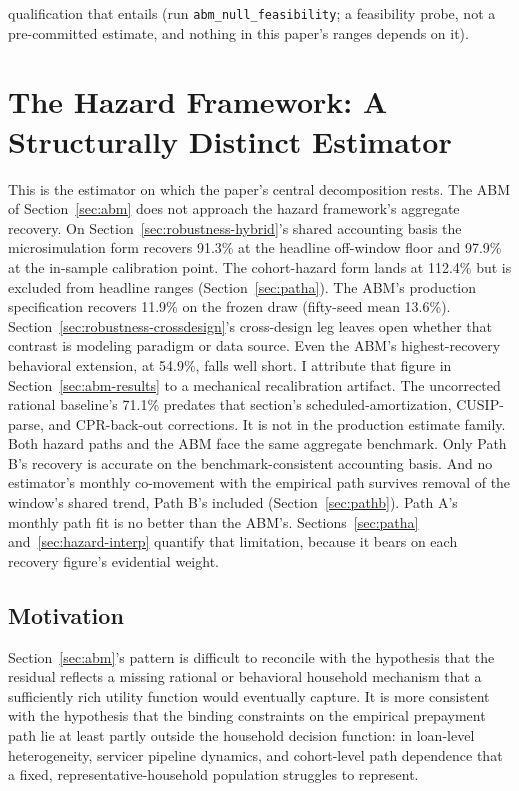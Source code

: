 \documentclass[12pt]{article}
\begin{document}
qualification that entails (run \texttt{abm\_null\_feasibility}; a feasibility probe, not a pre-committed estimate, and nothing in this paper's ranges depends on it).
\section{The Hazard Framework: A Structurally Distinct Estimator}\label{sec:hazard}

This is the estimator on which the paper's central decomposition rests. The ABM of Section~\ref{sec:abm} does not approach the hazard framework's aggregate recovery. On Section~\ref{sec:robustness-hybrid}'s shared accounting basis the microsimulation form recovers 91.3\% at the headline off-window floor and 97.9\% at the in-sample calibration point. The cohort-hazard form lands at 112.4\% but is excluded from headline ranges (Section~\ref{sec:patha}). The ABM's production specification recovers 11.9\% on the frozen draw (fifty-seed mean 13.6\%). Section~\ref{sec:robustness-crossdesign}'s cross-design leg leaves open whether that contrast is modeling paradigm or data source. Even the ABM's highest-recovery behavioral extension, at 54.9\%, falls well short. I attribute that figure in Section~\ref{sec:abm-results} to a mechanical recalibration artifact. The uncorrected rational baseline's 71.1\% predates that section's scheduled-amortization, CUSIP-parse, and CPR-back-out corrections. It is not in the production estimate family. Both hazard paths and the ABM face the same aggregate benchmark. Only Path B's recovery is accurate on the benchmark-consistent accounting basis. And no estimator's monthly co-movement with the empirical path survives removal of the window's shared trend, Path B's included (Section~\ref{sec:pathb}). Path A's monthly path fit is no better than the ABM's. Sections~\ref{sec:patha} and~\ref{sec:hazard-interp} quantify that limitation, because it bears on each recovery figure's evidential weight.

\subsection{Motivation}\label{sec:hazard-motivation}

Section~\ref{sec:abm}'s pattern is difficult to reconcile with the hypothesis that the residual reflects a missing rational or behavioral household mechanism that a sufficiently rich utility function would eventually capture. It is more consistent with the hypothesis that the binding constraints on the empirical prepayment path lie at least partly outside the household decision function: in loan-level heterogeneity, servicer pipeline dynamics, and cohort-level path dependence that a fixed, representative-household population struggles to represent.
\end{document}
